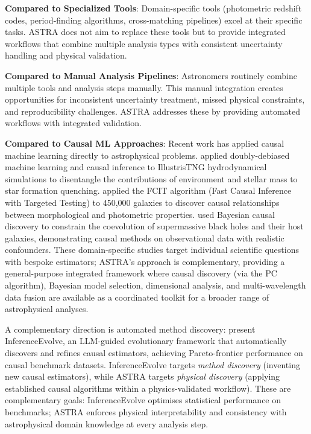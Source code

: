 \documentclass[usenatbib]{rasti}
\begin{document}
\textbf{Compared to Specialized Tools}: Domain-specific tools (photometric redshift codes, period-finding algorithms, cross-matching pipelines) excel at their specific tasks. ASTRA does not aim to replace these tools but to provide integrated workflows that combine multiple analysis types with consistent uncertainty handling and physical validation.

\textbf{Compared to Manual Analysis Pipelines}: Astronomers routinely combine multiple tools and analysis steps manually. This manual integration creates opportunities for inconsistent uncertainty treatment, missed physical constraints, and reproducibility challenges. ASTRA addresses these by providing automated workflows with integrated validation.

\textbf{Compared to Causal ML Approaches}: Recent work has applied causal machine learning directly to astrophysical problems. \citet{mucesh2024} applied doubly-debiased machine learning and causal inference to IllustrisTNG hydrodynamical simulations to disentangle the contributions of environment and stellar mass to star formation quenching. \citet{desmond2026} applied the FCIT algorithm (Fast Causal Inference with Targeted Testing) to 450,000 galaxies to discover causal relationships between morphological and photometric properties. \citet{jin2025} used Bayesian causal discovery to constrain the coevolution of supermassive black holes and their host galaxies, demonstrating causal methods on observational data with realistic confounders. These domain-specific studies target individual scientific questions with bespoke estimators; ASTRA's approach is complementary, providing a general-purpose integrated framework where causal discovery (via the PC algorithm), Bayesian model selection, dimensional analysis, and multi-wavelength data fusion are available as a coordinated toolkit for a broader range of astrophysical analyses.

A complementary direction is automated method discovery: \citet{chen2026inferenceevolve} present InferenceEvolve, an LLM-guided evolutionary framework that automatically discovers and refines causal estimators, achieving Pareto-frontier performance on causal benchmark datasets. InferenceEvolve targets \emph{method discovery} (inventing new causal estimators), while ASTRA targets \emph{physical discovery} (applying established causal algorithms within a physics-validated workflow). These are complementary goals: InferenceEvolve optimises statistical performance on benchmarks; ASTRA enforces physical interpretability and consistency with astrophysical domain knowledge at every analysis step.
\end{document}
